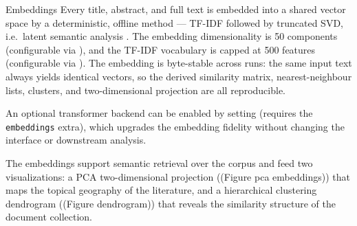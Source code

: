 \documentclass[
  ignorenonframetext,
]{beamer}
\begin{document}
\begin{frame}{Embeddings}
\protect{}\label{embeddings}
Every title, abstract, and full text is embedded into a shared vector
space by a deterministic, offline method --- TF-IDF followed by
truncated SVD, i.e.~latent semantic analysis
. The embedding dimensionality is 50
components (configurable via
), and the TF-IDF
vocabulary is capped at 500 features (configurable via
). The embedding is
byte-stable across runs: the same input text always yields identical
vectors, so the derived similarity matrix, nearest-neighbour lists,
clusters, and two-dimensional projection are all reproducible.

An optional transformer backend can be enabled by setting
 (requires the
\texttt{embeddings} extra), which upgrades the embedding fidelity
without changing the interface or downstream analysis.

The embeddings support semantic retrieval over the corpus and feed two
visualizations: a PCA two-dimensional projection ((Figure pca
embeddings)) that maps the topical geography of the literature, and a
hierarchical clustering dendrogram ((Figure dendrogram)) that reveals
the similarity structure of the document collection.
\end{frame}
\end{document}
